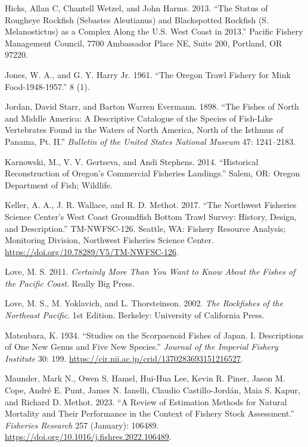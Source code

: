 \documentclass[
]{scrartcl}
\newlength{\cslhangindent}
\newenvironment{CSLReferences}[2] %
 {\begin{list}{}{%
  \setlength{\itemindent}{0pt}
  \setlength{\leftmargin}{0pt}
  \setlength{\parsep}{0pt}
  \ifodd #1
   \setlength{\leftmargin}{\cslhangindent}
   \setlength{\itemindent}{-1\cslhangindent}
  \fi
  \setlength{\itemsep}{#2\baselineskip}}}
 {\end{list}}
\begin{document}
\begin{CSLReferences}{1}{0}
Hicks, Allan C, Chantell Wetzel, and John Harms. 2013. {``The Status of
Rougheye Rockfish ({Sebastes} Aleutianus) and Blackspotted Rockfish
({S}. Melanostictus) as a Complex Along the {U}.{S}. {West} {Coast} in
2013.''} Pacific Fishery Management Council, 7700 Ambassador Place NE,
Suite 200, Portland, OR 97220.

Jones, W. A., and G. Y. Harry Jr. 1961. {``The {Oregon} {Trawl}
{Fishery} for {Mink} {Food}-1948-1957.''} 8 (1).

Jordan, David Starr, and Barton Warren Evermann. 1898. {``The Fishes of
{North} and {Middle} {America}: {A} Descriptive Catalogue of the Species
of Fish-Like Vertebrates Found in the Waters of {North} {America}, North
of the {Isthmus} of {Panama}, Pt. {II}.''} \emph{Bulletin of the United
States National Museum} 47: 1241--2183.

Karnowski, M., V. V. Gertseva, and Andi Stephens. 2014. {``Historical
{Reconstruction} of {Oregon}'s {Commercial} {Fisheries} {Landings}.''}
Salem, OR: Oregon Department of Fish; Wildlife.

Keller, A. A., J. R. Wallace, and R. D. Methot. 2017. {``The {N}orthwest
{F}isheries {S}cience {C}enter's West Coast Groundfish Bottom Trawl
Survey: History, Design, and Description.''} TM-NWFSC-126. Seattle, WA:
Fishery Resource Analysis; Monitoring Division, Northwest Fisheries
Science Center. \url{https://doi.org/10.78289/V5/TM-NWFSC-126}.

Love, M. S. 2011. \emph{Certainly {More} {Than} {You} {Want} to {Know}
{About} the {Fishes} of the {Pacific} {Coast}}. Really Big Press.

Love, M. S., M. Yoklavich, and L. Thorsteinson. 2002. \emph{The
{Rockfishes} of the {Northeast} {Pacific}}. 1st Edition. Berkeley:
University of California Press.

Matsubara, K. 1934. {``Studies on the Scorpaenoid Fishes of Japan. I.
Descriptions of One New Genus and Five New Species.''} \emph{Journal of
the Imperial Fishery Institute} 30: 199.
\url{https://cir.nii.ac.jp/crid/1370283693151216527}.

Maunder, Mark N., Owen S. Hamel, Hui-Hua Lee, Kevin R. Piner, Jason M.
Cope, André E. Punt, James N. Ianelli, Claudio Castillo-Jordán, Maia S.
Kapur, and Richard D. Methot. 2023. {``A Review of Estimation Methods
for Natural Mortality and Their Performance in the Context of Fishery
Stock Assessment.''} \emph{Fisheries Research} 257 (January): 106489.
\url{https://doi.org/10.1016/j.fishres.2022.106489}.


\end{CSLReferences}
\end{document}
